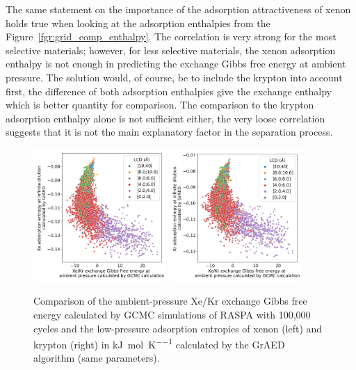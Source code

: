 \documentclass[main]{subfiles}
\begin{document}
The same statement on the importance of the adsorption attractiveness of xenon holds true when looking at the adsorption enthalpies from the Figure~\ref{fgr:grid_comp_enthalpy}. The correlation is very strong for the most selective materials; however, for less selective materials, the xenon adsorption enthalpy is not enough in predicting the exchange Gibbs free energy at ambient pressure. The solution would, of course, be to include the krypton into account first, the difference of both adsorption enthalpies give the exchange enthalpy which is  better quantity for comparison. The comparison to the krypton adsorption enthalpy alone is not sufficient either, the very loose correlation suggests that it is not the main explanatory factor in the separation process.

\begin{figure}[ht]
  \centering
    \includegraphics[width=0.45\textwidth]{figures/3-fastsim/G_2080_vs_S_Xe_grid_overview.jpg}
    \includegraphics[width=0.45\textwidth]{figures/3-fastsim/G_2080_vs_S_Kr_grid_overview.jpg}
    \caption{Comparison of the ambient-pressure Xe/Kr exchange Gibbs free energy calculated by GCMC simulations of RASPA with 100,000 cycles and the low-pressure adsorption entropies of xenon (left) and krypton (right) in \si{\kilo\joule\per\mole\per\kelvin} calculated by the GrAED algorithm (same parameters).}\label{fgr:grid_comp_entropy}
\end{figure}
\end{document}
